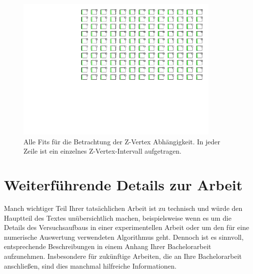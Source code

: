 \documentclass[a4paper,11pt,oneside,final,german,openbib,pdftex]{scrbook}
\begin{document}
{\begin{appendix}
\begin{figure}[h!]
	\begin{center}
		\includegraphics[width=100mm]{20171804ZVertexAllFits}
		\caption{Alle Fits f\"ur die Betrachtung der Z-Vertex Abh\"angigkeit. In jeder Zeile ist ein einzelnes Z-Vertex-Intervall aufgetragen.}
		\label{fig:ZVertex-All-Fits}
	\end{center}
\end{figure}



\section{Weiterf\"uhrende Details zur Arbeit}

Manch wichtiger Teil Ihrer tats\"achlichen Arbeit ist zu technisch 
und w\"urde den Hauptteil des Textes un\"ubersichtlich machen, 
beispielsweise wenn es um die Details des Versuchsaufbaus in einer 
experimentellen Arbeit oder um den f\"ur eine numerische Auswertung 
verwendeten Algorithmus geht. Dennoch ist es sinnvoll, entsprechende 
Beschreibungen in einem Anhang Ihrer Bachelorarbeit aufzunehmen. 
Insbesondere f\"ur zuk\"unftige Arbeiten, die an Ihre Bachelorarbeit 
anschlie{\ss}en, sind dies manchmal hilfreiche Informationen.






\end{appendix}}
\end{document}
